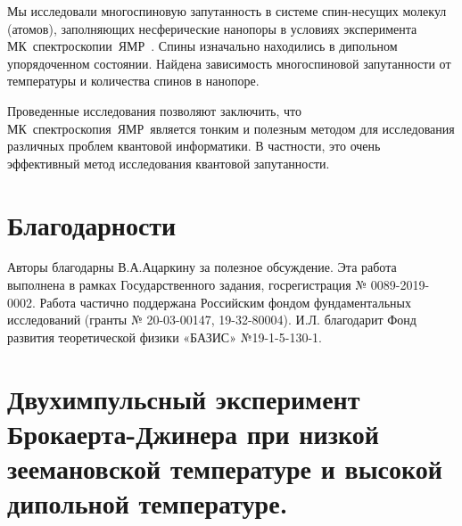 \documentclass[utf8]{jetp}
\begin{document}
Мы исследовали многоспиновую запутанность в системе спин-несущих молекул (атомов), заполняющих несферические нанопоры в условиях эксперимента МК~спектроскопии~ЯМР~.
Спины изначально находились в дипольном упорядоченном состоянии.
Найдена зависимость многоспиновой запутанности от температуры и количества спинов в нанопоре.

Проведенные исследования позволяют заключить, что МК~спектроскопия~ЯМР~является тонким и полезным методом для исследования различных проблем квантовой информатики.
В частности, это очень эффективный метод исследования квантовой запутанности.


\section{Благодарности}
Авторы благодарны В.А.Ацаркину за полезное обсуждение. Эта работа выполнена в рамках Государственного задания, госрегистрация № 0089-2019-0002.
Работа частично поддержана Российским фондом фундаментальных исследований (гранты № 20-03-00147, 19-32-80004).
И.Л. благодарит Фонд развития теоретической физики «БАЗИС» №19-1-5-130-1.



\appendix
\section{Двухимпульсный эксперимент Брокаерта-Джинера при низкой зеемановской температуре и высокой дипольной температуре.}
\end{document}

